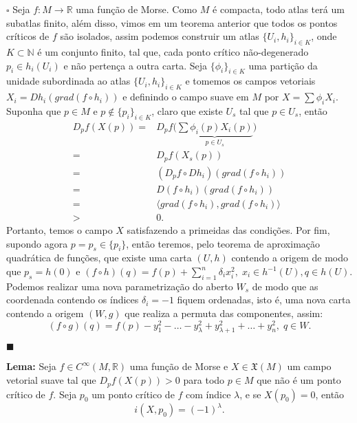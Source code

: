 \documentclass{article}
\begin{document}
	$\square$ Seja $f : M \to \mathbb{R}$ uma função de Morse. Como $M$ é compacta, todo atlas terá um subatlas finito, além disso, vimos em um teorema anterior que todos os pontos críticos de $f$ são isolados, assim podemos construir um atlas $\{U_{i}, h_{i}\}_{i \in K}$, onde $K \subset \mathbb{N}$ é um conjunto finito, tal que, cada ponto crítico não-degenerado $p_{i} \in h_{i}(U_{i})$ e não pertença a outra carta. Seja $\{\phi_{i}\}_{i \in K}$ uma partição da unidade subordinada ao atlas $\{U_{i}, h_{i}\}_{i \in K}$ e tomemos os campos vetoriais $X_{i} = Dh_{i}(grad(f \circ h_{i}))$ e definindo o campo suave em $M$ por $X = \sum \phi_{i} X_{i}$. Suponha que $p \in M$ e $p \notin \{p_{i}\}_{i \in K}$, claro que existe $U_{s}$ tal que $p \in U_{s}$, então 
	$$
	\begin{aligned}
	D_{p}f(X(p)) =& D_{p}f \Big(\underbrace{ \sum \phi_{i}(p) X_{i}(p) }_{p \in U_{s}}\Big) 
	\\
	=& D_{p}f(X_{s}(p)) 
	\\
	=& (D_{p}f \circ Dh_{i})(grad(f \circ h_{i}))
	\\
	=& D(f \circ h_{i})(grad(f \circ h_{i})) 
	\\
	=& \langle grad(f \circ h_{i}), grad(f \circ h_{i}) \rangle 
	\\
	>&0.
	\end{aligned}
	$$
	Portanto, temos o campo $X$ satisfazendo a primeidas das condições. Por fim, supondo agora $p = p_{s} \in \{p_{i}\}$, então teremos, pelo teorema de aproximação quadrática de funções, que existe uma carta $(U, h)$ contendo a origem de modo que $p_{s} = h(0)$ e $(f \circ h) (q) = f(p) + \sum_{i=1}^{n}\delta_{i}x_{i}^{2}, \; x_{i} \in h^{-1}(U), q \in h(U)$. Podemos realizar uma nova parametrização do aberto $W_{s}$ de modo que as coordenada contendo os índices $\delta_{i} = -1$ fiquem ordenadas, isto é, uma nova carta contendo a origem $(W, g)$ que realiza a permuta das componentes, assim:
	$$
	(f \circ g) (q) = f(p) - y_{1}^{2} - \dots - y_{\lambda}^{2} + y_{\lambda+1}^{2} + \dots + y_{n}^{2}, \; q \in W.
	$$
	
	$\blacksquare$
	
	\vspace{2mm}
	\textbf{Lema:} Seja $f \in C^{\infty}(M, \mathbb{R})$ uma função de Morse e $X \in \mathfrak{X}(M)$ um campo vetorial suave tal que $D_{p}f(X(p)) > 0$ para todo $p \in M$ que não é um ponto crítico de $f$. Seja $p_{0}$ um ponto crítico de $f$ com índice $\lambda$, e se $X(p_{0}) = 0$, então 
	$$
	i(X, p_{0}) = (-1)^{\lambda}.
	$$
	
\end{document}
